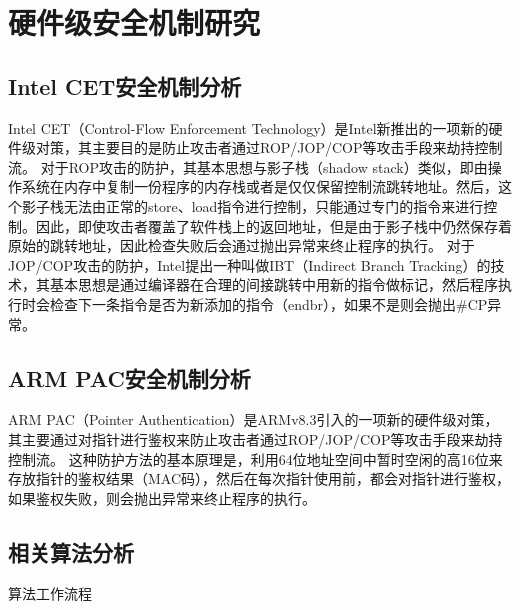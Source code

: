 %
%

\chapter{硬件级安全机制研究}\label{chap4}

\section{Intel CET安全机制分析}

Intel CET（Control-Flow Enforcement Technology）是Intel新推出的一项新的硬件级对策，其主要目的是防止攻击者通过ROP/JOP/COP等攻击手段来劫持控制流。
对于ROP攻击的防护，其基本思想与影子栈（shadow stack）类似，即由操作系统在内存中复制一份程序的内存栈或者是仅仅保留控制流跳转地址。然后，这个影子栈无法由正常的store、load指令进行控制，只能通过专门的指令来进行控制。因此，即使攻击者覆盖了软件栈上的返回地址，但是由于影子栈中仍然保存着原始的跳转地址，因此检查失败后会通过抛出异常来终止程序的执行。
对于JOP/COP攻击的防护，Intel提出一种叫做IBT（Indirect Branch Tracking）的技术，其基本思想是通过编译器在合理的间接跳转中⽤新的指令做标记，然后程序执行时会检查下一条指令是否为新添加的指令（endbr），如果不是则会抛出\#CP异常。

\section{ARM PAC安全机制分析}

ARM PAC（Pointer Authentication）是ARMv8.3引入的一项新的硬件级对策，其主要通过对指针进行鉴权来防止攻击者通过ROP/JOP/COP等攻击手段来劫持控制流。
这种防护方法的基本原理是，利用64位地址空间中暂时空闲的高16位来存放指针的鉴权结果（MAC码），然后在每次指针使用前，都会对指针进行鉴权，如果鉴权失败，则会抛出异常来终止程序的执行。

\section{相关算法分析}

\begin{algorithm}[h!]
\caption{算法工作流程}
\label{alg4.1}


\end{algorithm}